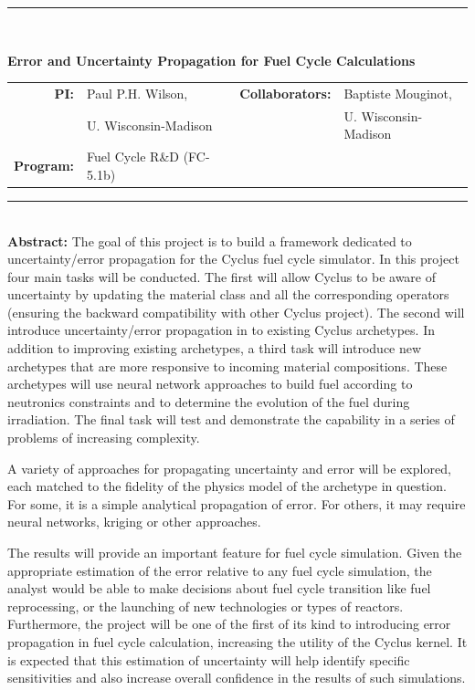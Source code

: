 \documentclass[dvips,12pt]{article}
\begin{document}
\vspace*{0.5in}

\noindent\rule{\textwidth}{1pt}\

\vspace*{0.2in}

\begin{centering}
  \textbf{\large Error and Uncertainty Propagation for Fuel Cycle Calculations}\\
\end{centering}

\vspace*{0.25in}

\noindent
\begin{tabularx}{\textwidth}{rlrl}
   \textbf{PI:} & Paul P.H. Wilson, & 
         \textbf{Collaborators:} & Baptiste Mouginot, \\
                & U. Wisconsin-Madison & 
         & U. Wisconsin-Madison \\
   \textbf{Program:} & Fuel Cycle R\&D (FC-5.1b) & &
\end{tabularx}



\vspace{0.2in}
\noindent\rule{\textwidth}{1pt}\\

\noindent\textbf{Abstract:} The goal of this
project is to build a framework dedicated to
uncertainty/error propagation for the Cyclus fuel
cycle simulator. In this project four main tasks
will be conducted. The first will allow Cyclus to
be aware of uncertainty by updating the material
class and all the corresponding operators
(ensuring the backward compatibility with other
Cyclus project). The second will introduce
uncertainty/error propagation in to existing Cyclus
archetypes.  In addition to improving existing
archetypes, a third task will introduce new archetypes that
are more responsive to incoming material
compositions.  These archetypes will use neural
network approaches to build fuel according to
neutronics constraints and to determine the
evolution of the fuel during irradiation.  The
final task will test and demonstrate the capability
in a series of problems of increasing complexity.

A variety of approaches for propagating
uncertainty and error will be explored, each
matched to the fidelity of the physics model of
the archetype in question.  For some, it is a
simple analytical propagation of error.  For
others, it may require neural networks, kriging or
other approaches.

The results will provide an important feature for
fuel cycle simulation. Given the appropriate
estimation of the error relative to any fuel cycle
simulation, the analyst would be able to make
decisions about fuel cycle transition like fuel
reprocessing, or the launching of new technologies
or types of reactors. Furthermore, the project
will be one of the first of its kind to
introducing error propagation in fuel cycle
calculation, increasing the utility of the Cyclus
kernel.  It is expected that this estimation of
uncertainty will help identify specific
sensitivities and also increase overall confidence
in the results of such simulations.
\end{document}
